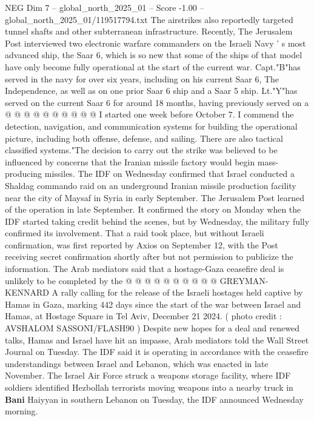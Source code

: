 \begin{textsample}{NEG Dim 7 – global\_north\_2025\_01 – Score -1.00 – global\_north\_2025\_01/119517794.txt}
The airstrikes also reportedly targeted tunnel shafts and other subterranean infrastructure.
Recently, The Jerusalem Post interviewed two electronic warfare commanders on the Israeli Navy ' s most advanced ship, the Saar 6, which is so new that some of the ships of that model have only become fully operational at the start of the current war.
Capt."B"has served in the navy for over six years, including on his current Saar 6, The Independence, as well as on one prior Saar 6 ship and a Saar 5 ship.
Lt."Y"has served on the current Saar 6 for around 18 months, having previously served on a @ @ @ @ @ @ @ @ @ @ I started one week before October 7.
I commend the detection, navigation, and communication systems for building the operational picture, including both offense, defense, and sailing.
There are also tactical classified systems."The decision to carry out the strike was believed to be influenced by concerns that the Iranian missile factory would begin mass-producing missiles.
The IDF on Wednesday confirmed that Israel conducted a Shaldag commando raid on an underground Iranian missile production facility near the city of Maysaf in Syria in early September.
The Jerusalem Post learned of the operation in late September.
It confirmed the story on Monday when the IDF started taking credit behind the scenes, but by Wednesday, the military fully confirmed its involvement.
That a raid took place, but without Israeli confirmation, was first reported by Axios on September 12, with the Post receiving secret confirmation shortly after but not permission to publicize the information.
The Arab mediators said that a hostage-Gaza ceasefire deal is unlikely to be completed by the @ @ @ @ @ @ @ @ @ @ GREYMAN-KENNARD A rally calling for the release of the Israeli hostages held captive by Hamas in Gaza, marking 442 days since the start of the war between Israel and Hamas, at Hostage Square in Tel Aviv, December 21 2024. ( photo credit : AVSHALOM SASSONI/FLASH90 ) Despite new hopes for a deal and renewed talks, Hamas and Israel have hit an impasse, Arab mediators told the Wall Street Journal on Tuesday.
The IDF said it is operating in accordance with the ceasefire understandings between Israel and Lebanon, which was enacted in late November.
The Israel Air Force struck a weapons storage facility, where IDF soldiers identified Hezbollah terrorists moving weapons into a nearby truck in \textbf{Bani} Haiyyan in southern Lebanon on Tuesday, the IDF announced Wednesday morning.

\end{textsample}
